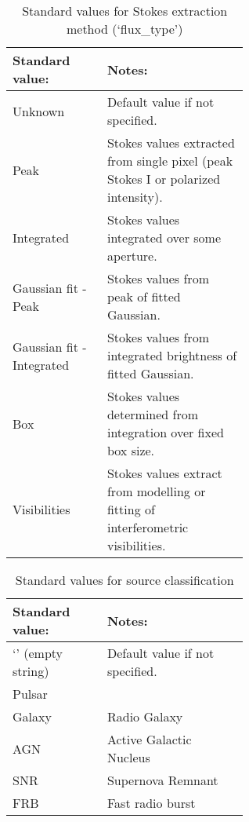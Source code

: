 \documentclass[10pt,modern]{aastex63}
\begin{document}
\begin{table}[h]
\caption{Standard values for Stokes extraction method (`flux\_type')}\label{tab:flux_type}
\begin{center}
\begin{tabular}{|l|p{0.6\linewidth}|} \hline
{\bf Standard value:} & {\bf Notes:} \\ \hline
Unknown & Default value if not specified.\\
Peak & Stokes values extracted from single pixel (peak Stokes I or polarized intensity).\\
Integrated & Stokes values integrated over some aperture.\\
Gaussian fit - Peak & Stokes values from peak of fitted Gaussian.\\
Gaussian fit - Integrated & Stokes values from integrated brightness of fitted Gaussian.\\
Box & Stokes values determined from integration over fixed box size.\\
Visibilities & Stokes values extract from modelling or fitting of interferometric visibilities.\\
\hline
\end{tabular}
\end{center}
\label{default}
\end{table}%





\begin{table}[h]
\caption{Standard values for source classification}\label{tab:source_type}
\begin{center}
\begin{tabular}{|l|p{0.6\linewidth}|} \hline
{\bf Standard value:} & {\bf Notes:} \\ \hline
`' (empty string) & Default value if not specified.\\
Pulsar & \\
Galaxy & Radio Galaxy \\
AGN & Active Galactic Nucleus \\
SNR & Supernova Remnant\\
FRB & Fast radio burst\\
\hline
\end{tabular}
\end{center}
\label{default}
\end{table}%

 \clearpage

{} %
\end{document}
